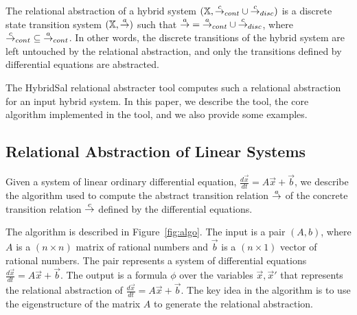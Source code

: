 \documentclass{llncs}
\begin{document}
The relational abstraction of a hybrid system 
$(\mathbb{X}, {\stackrel{c}{\rightarrow}}_{cont}\cup{\stackrel{c}{\rightarrow}}_{disc})$ 
is a discrete state transition system $(\mathbb{X}, {\stackrel{a}{\rightarrow}})$ such that
${\stackrel{a}{\rightarrow}} = {\stackrel{a}{\rightarrow}}_{cont}\cup{\stackrel{c}{\rightarrow}}_{disc}$, where 
${\stackrel{c}{\rightarrow}}_{cont} \subseteq {\stackrel{a}{\rightarrow}}_{cont}$.
In other words, the discrete transitions of the hybrid system
are left untouched by the relational abstraction, and only the
transitions defined by differential equations are abstracted.

The HybridSal relational abstracter tool computes such a relational
abstraction for an input hybrid system. 
In this paper, we describe the tool, the core algorithm implemented in the
tool, and we also provide some examples. %

\subsection{Relational Abstraction of Linear Systems}

Given a system of linear ordinary differential equation,
$\frac{d\vec{x}}{dt} = A\vec{x}+\vec{b}$, we describe the
algorithm used to compute the abstract transition relation
${\stackrel{a}{\rightarrow}}$ of the concrete transition relation ${\stackrel{c}{\rightarrow}}$ defined
by the differential equations.

The algorithm is described in Figure~\ref{fig:algo}.  
The input is a pair $(A,b)$, where
$A$ is a $(n\times n)$ matrix of rational numbers
and $\vec{b}$ is a $(n\times 1)$ vector of rational numbers.
The pair represents a system of differential equations
$\frac{d\vec{x}}{dt} = A\vec{x}+\vec{b}$.
The output is a formula $\phi$ over the variables
$\vec{x},\vec{x}'$ that represents the relational
abstraction of $\frac{d\vec{x}}{dt} = A\vec{x}+\vec{b}$.
The key idea in the algorithm is to use 
the eigenstructure of the matrix $A$ to generate the
relational abstraction.
\end{document}
